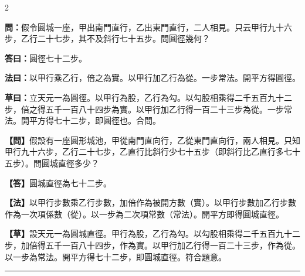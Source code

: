 \documentclass[11pt,a4paper]{article}
\newcommand{\longline}{\noindent\rule{\textwidth}{0.4pt}}
\newcommand{\wenC}[1]{\par\noindent\textbf{\textcolor{probcolor}{問：}}{#1}\par}
\newcommand{\daC}[1]{\par\noindent\textbf{\textcolor{anscolor}{答曰：}}{#1}\par}
\newcommand{\fayueC}[1]{\par\noindent\textbf{\textcolor{methodcolor}{法曰：}}{#1}\par}
\newcommand{\caoyueC}[1]{\par\noindent\textbf{草曰：}{#1}\par}
\newcommand{\wenM}[1]{\par\noindent\textbf{\textcolor{probcolor}{【問】}}{#1}\par}
\newcommand{\daM}[1]{\par\noindent\textbf{\textcolor{anscolor}{【答】}}{#1}\par}
\newcommand{\fayueM}[1]{\par\noindent\textbf{\textcolor{methodcolor}{【法】}}{#1}\par}
\newcommand{\caoyueM}[1]{\par\noindent\textbf{【草】}{#1}\par}
\begin{document}
\begin{paracol}{2}

\wenC{假令圓城一座，甲出南門直行，乙出東門直行，二人相見。只云甲行九十六步，乙行二十七步，其不及斜行七十五步。問圓徑幾何？}

\daC{圓徑七十二步。}

\fayueC{以甲行乘乙行，倍之為實。以甲行加乙行為從。一步常法。開平方得圓徑。}

\caoyueC{立天元一為圓徑。以甲行為股，乙行為勾。以勾股相乘得二千五百九十二步，倍之得五千一百八十四步為實。以甲行加乙行得一百二十三步為從。一步常法。開平方得七十二步，即圓徑也。合問。}

\switchcolumn

\wenM{假設有一座圓形城池，甲從南門直向行，乙從東門直向行，兩人相見。只知甲行九十六步，乙行二十七步，乙直行比斜行少七十五步（即斜行比乙直行多七十五步）。問圓城直徑多少？}

\daM{圓城直徑為七十二步。}

\fayueM{以甲行步數乘乙行步數，加倍作為被開方數（實）。以甲行步數加乙行步數作為一次項係數（從）。以一步為二次項常數（常法）。開平方即得圓城直徑。}

\caoyueM{設天元一為圓城直徑。甲行為股，乙行為勾。以勾股相乘得二千五百九十二步，加倍得五千一百八十四步，作為實。以甲行加乙行得一百二十三步，作為從。以一步為常法。開平方得七十二步，即圓城直徑。符合題意。}

\end{paracol}

\vspace{0.3cm}
\longline
\end{document}
